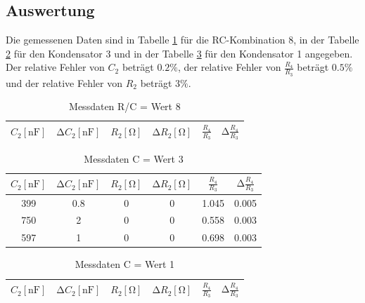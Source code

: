 \subsection{Auswertung}
Die gemessenen Daten sind in Tabelle \ref{tab:3} für die RC-Kombination 8, in der Tabelle \ref{tab:4} für den Kondensator 3 und in der Tabelle \ref{tab:5} für den Kondensator 1 angegeben.
Der relative Fehler von $C_2$ beträgt $0.2\%$, der relative Fehler von $\frac{R_4}{R_3}$ beträgt $0.5\%$ und der relative Fehler von $R_2$ beträgt $3\%$. \cite{sample}
\begin{table}[H]
  \centering
  \caption{Messdaten R/C = Wert 8}
  \label{tab:3}
  \begin{tabular}{c c c c c c}
    \toprule
    {$C_2 [\si{\nano\farad}]$} & {$\increment C_2 [\si{\nano\farad}]$} & {$R_2 [\si{\ohm}]$} & {$\increment R_2 [\si{\ohm}]$} & {$\frac{R_4}{R_3}$} & {$\increment \frac{R_4}{R_3}$} \\
    \midrule
    
    \bottomrule
  \end{tabular}
\end{table}
\begin{table}[H]
  \centering
  \caption{Messdaten C = Wert 3}
  \label{tab:4}
  \begin{tabular}{c c c c c c}
    \toprule
    {$C_2 [\si{\nano\farad}]$} & {$\increment C_2 [\si{\nano\farad}]$} & {$R_2 [\si{\ohm}]$} & {$\increment R_2 [\si{\ohm}]$} & {$\frac{R_4}{R_3}$} & {$\increment \frac{R_4}{R_3}$} \\
    \midrule
    \num{399} & \num{0.8} & \num{0} & \num{0} & \num{1.045} & \num{0.005} \\
    \num{750} & \num{2} & \num{0} & \num{0} & \num{0.558} & \num{0.003} \\
    \num{597} & \num{1} & \num{0} & \num{0} & \num{0.698} & \num{0.003} \\
    \bottomrule
  \end{tabular}
\end{table}
\begin{table}[H]
  \centering
  \caption{Messdaten C = Wert 1}
  \label{tab:5}
  \begin{tabular}{c c c c c c}
    \toprule
    {$C_2 [\si{\nano\farad}]$} & {$\increment C_2 [\si{\nano\farad}]$} & {$R_2 [\si{\ohm}]$} & {$\increment R_2 [\si{\ohm}]$} & {$\frac{R_4}{R_3}$} & {$\increment \frac{R_4}{R_3}$} \\
    \midrule
    
    \bottomrule
  \end{tabular}
\end{table}

